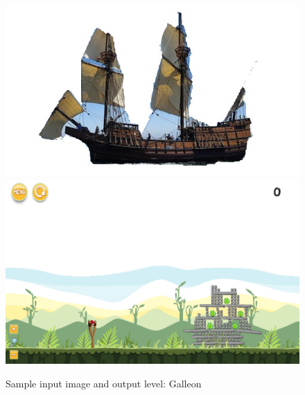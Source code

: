 \documentclass{dalthesis}
\begin{document}
\begin{figure}
	\caption{Sample input image and output level: Galleon}
  \includegraphics[width=\textwidth,height=\textheight,keepaspectratio]{levels/pictures/ships/galleon.jpg}
  \includegraphics[width=\textwidth,height=\textheight,keepaspectratio]{levels/screenshots/ships/galleon.png}
\end{figure}
\end{document}
